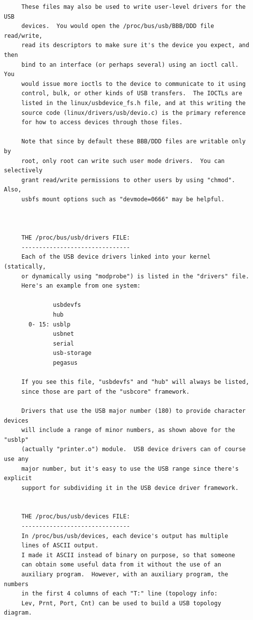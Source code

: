{{{{{{{{{\begin{verbatim}
     These files may also be used to write user-level drivers for the USB
     devices.  You would open the /proc/bus/usb/BBB/DDD file read/write,
     read its descriptors to make sure it's the device you expect, and then
     bind to an interface (or perhaps several) using an ioctl call.  You
     would issue more ioctls to the device to communicate to it using
     control, bulk, or other kinds of USB transfers.  The IOCTLs are
     listed in the linux/usbdevice_fs.h file, and at this writing the
     source code (linux/drivers/usb/devio.c) is the primary reference
     for how to access devices through those files.
     
     Note that since by default these BBB/DDD files are writable only by
     root, only root can write such user mode drivers.  You can selectively
     grant read/write permissions to other users by using "chmod".  Also,
     usbfs mount options such as "devmode=0666" may be helpful.
     
     
     
     THE /proc/bus/usb/drivers FILE:
     -------------------------------
     Each of the USB device drivers linked into your kernel (statically,
     or dynamically using "modprobe") is listed in the "drivers" file.
     Here's an example from one system:
     
              usbdevfs
              hub
       0- 15: usblp
              usbnet
              serial
              usb-storage
              pegasus
     
     If you see this file, "usbdevfs" and "hub" will always be listed,
     since those are part of the "usbcore" framework.
     
     Drivers that use the USB major number (180) to provide character devices
     will include a range of minor numbers, as shown above for the "usblp"
     (actually "printer.o") module.  USB device drivers can of course use any
     major number, but it's easy to use the USB range since there's explicit
     support for subdividing it in the USB device driver framework.
     
     
     THE /proc/bus/usb/devices FILE:
     -------------------------------
     In /proc/bus/usb/devices, each device's output has multiple
     lines of ASCII output.
     I made it ASCII instead of binary on purpose, so that someone
     can obtain some useful data from it without the use of an
     auxiliary program.  However, with an auxiliary program, the numbers
     in the first 4 columns of each "T:" line (topology info:
     Lev, Prnt, Port, Cnt) can be used to build a USB topology diagram.
     

\end{verbatim}}}}}}}}}}

